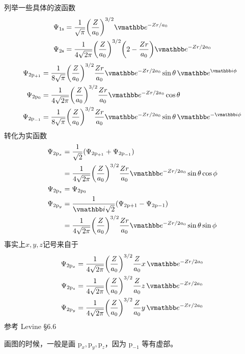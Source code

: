     列举一些具体的波函数
    \begin{align}
    \Psi_{1\mathrm{s}} &= \dfrac{1}{\sqrt{\pi}} \qty(\dfrac{Z}{a_0})^{3/2} \ee^{-Zr/a_0} \\
    \Psi_{2\mathrm{s}} &= \dfrac{1}{4\sqrt{2\pi}} \qty(\dfrac{Z}{a_0})^{3/2} \qty(2-\dfrac{Zr}{a_0}) \ee^{-Zr/2a_0}
    \end{align}
    \begin{align}
    \Psi_{2\mathrm{p}_{+1}} &= \dfrac{1}{8\sqrt{\pi}} \qty(\dfrac{Z}{a_0})^{3/2}  \dfrac{Zr}{a_0} \ee^{-Zr/2a_0} \sin\theta \,\ee^ {\ii\phi} \\
    \Psi_{2\mathrm{p}_0} &= \dfrac{1}{4\sqrt{2\pi}} \qty(\dfrac{Z}{a_0})^{3/2}  \dfrac{Zr}{a_0} \ee^{-Zr/2a_0} \cos\theta \\
    \Psi_{2\mathrm{p}_{-1}} &= \dfrac{1}{8\sqrt{\pi}} \qty(\dfrac{Z}{a_0})^{3/2}  \dfrac{Zr}{a_0} \ee^{-Zr/2a_0} \sin\theta \,\ee^ {-\ii\phi}
    \end{align}
    转化为实函数
    \begin{align}
    \Psi_{2\mathrm{p}_x} &= \dfrac{1}{\sqrt{2}}( \Psi_{2\mathrm{p}_{+1}} + \Psi_{2\mathrm{p}_{-1}}) \\
    &= \dfrac{1}{4\sqrt{2\pi}} \qty(\dfrac{Z}{a_0})^{3/2}  \dfrac{Zr}{a_0} \ee^{-Zr/2a_0} \sin\theta\cos\phi\\
    \Psi_{2\mathrm{p}_z} &= \Psi_{2\mathrm{p}_0}\\
    \Psi_{2\mathrm{p}_y} &=  \dfrac{1} {\ii\sqrt{2}}( \Psi_{2\mathrm{p}+1} - \Psi_{2\mathrm{p}-1}) \\
    &=\dfrac{1}{4\sqrt{2\pi}} \qty(\dfrac{Z}{a_0})^{3/2}  \dfrac{Zr}{a_0} \ee^{-Zr/2a_0} \sin\theta\sin\phi 
    \end{align}
    事实上$ x,y,z $记号来自于
    \begin{align}
    \Psi_{2\mathrm{p}_x} &=  \dfrac{1}{4\sqrt{2\pi}} \qty(\dfrac{Z}{a_0})^{3/2}  \dfrac{Z}{a_0} x\, \ee^{-Zr/2a_0} \\
    \Psi_{2\mathrm{p}_z} &= \dfrac{1}{4\sqrt{2\pi}} \qty(\dfrac{Z}{a_0})^{3/2}  \dfrac{Z}{a_0} z\, \ee^{-Zr/2a_0}\\
    \Psi_{2\mathrm{p}_y} &= \dfrac{1}{4\sqrt{2\pi}} \qty(\dfrac{Z}{a_0})^{3/2}  \dfrac{Z}{a_0} y\, \ee^{-Zr/2a_0} 
    \end{align}
    参考 Levine \S 6.6

画图的时候，一般是画 $\mathrm{p}_x, \mathrm{p}_y, \mathrm{p}_z$，因为 $\mathrm{p}_{-1}$ 等有虚部。


